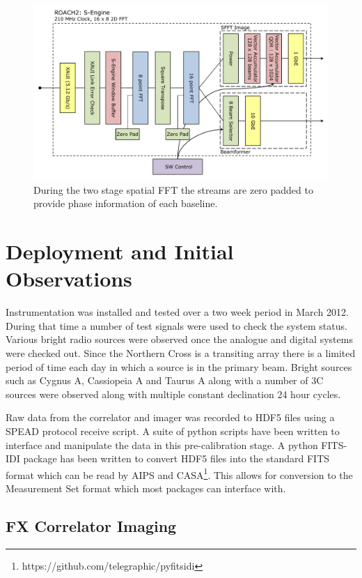 \documentclass[useAMS,macros,usenatbib,onecolumn]{mn2e}
\begin{document}
\begin{figure}
    \centering
    \includegraphics[scale=0.6]{graphics/crop_sengine_block.pdf}
    \caption{During the two stage spatial FFT the streams are zero padded to provide phase information of each baseline.}
    \label{fig:seng_block}
\end{figure}

\section{Deployment and Initial Observations}
\label{observations}

Instrumentation was installed and tested over a two week period in March 2012.
During that time a number of test signals were used to check the system status.
Various bright radio sources were observed once the analogue and digital systems were checked out.
Since the Northern Cross is a transiting array there is a limited period of time each day in which a source is in the primary beam.
Bright sources such as Cygnus A, Cassiopeia A and Taurus A along with a number of 3C sources were observed along with multiple constant declination 24 hour cycles.

Raw data from the correlator and imager was recorded to HDF5 files using a SPEAD protocol receive script.
A suite of python scripts have been written to interface and manipulate the data in this pre-calibration stage.
A python FITS-IDI package has been written to convert HDF5 files into the standard FITS format which can be read by AIPS and CASA\footnote{https://github.com/telegraphic/pyfitsidi}.
This allows for conversion to the Measurement Set format which most packages can interface with.

\subsection{FX Correlator Imaging}
\label{fx_results}
\end{document}
